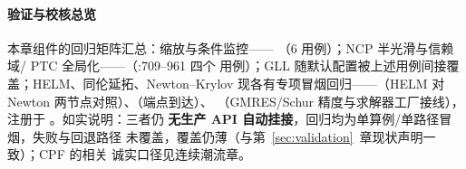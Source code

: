 \paragraph{验证与校核总览} 本章组件的回归矩阵汇总：缩放与条件监控——
（6 用例）；NCP 半光滑与信赖域/
PTC 全局化——（:709--961 四个
用例）；GLL 随默认配置被上述用例间接覆盖；HELM、同伦延拓、Newton--Krylov
现各有专项冒烟回归——（HELM 对 Newton
两节点对照）、（端点到达）、
（GMRES/Schur 精度与求解器工厂接线），
注册于 。如实说明：三者仍
\textbf{无生产 API 自动挂接}，回归均为单算例/单路径冒烟，失败与回退路径
未覆盖，覆盖仍薄（与第~\ref{sec:validation}~章现状声明一致）；CPF 的相关
诚实口径见连续潮流章。
